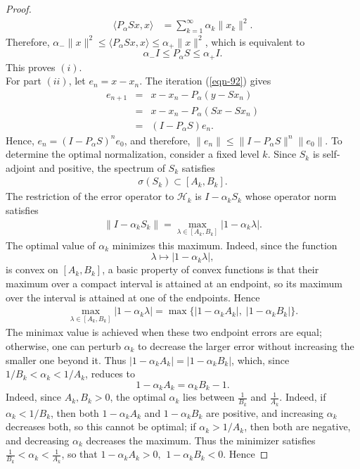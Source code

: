 \documentclass[12pt,titlepage]{amsart}
\theoremstyle{definition}
\theoremstyle{remark}
\begin{document}
\begin{proof}
\begin{eqnarray*}
\langle P_\alpha Sx,x\rangle &= \sum_{k=1}^{\infty}
\alpha_k\|x_k\|^2.
\end{eqnarray*}
Therefore, $\alpha_-\|x\|^2 \le \langle P_\alpha Sx,x\rangle \le
\alpha_+\|x\|^2$, which is equivalent to $$\alpha_-I \le P_\alpha
S \le \alpha_+I.$$ This proves $(i)$.\\
For part $(ii)$, let $e_n=x-x_n $. The iteration (\ref{eqn-92})
gives
\begin{eqnarray*}
e_{n+1} &=& x-x_n-P_\alpha(y-Sx_n)\\ &=& x-x_n-P_\alpha(Sx-Sx_n)\\
&=& (I-P_\alpha S)e_n .
\end{eqnarray*}
Hence, $e_n=(I-P_\alpha S)^ne_0$, and therefore, $\|e_n\| \leq
\|I-P_\alpha S\|^n \|e_0\|$. To determine the optimal
normalization, consider a fixed level $k$. Since $S_k$ is
self-adjoint and positive, the spectrum of $S_k$ satisfies
\begin{eqnarray*}
\sigma(S_k) \subset[A_k,B_k].
\end{eqnarray*}
The restriction of the error operator to $\mathcal H_k$ is
$I-\alpha_kS_k$ whose operator norm satisfies
\begin{eqnarray*}
\|I-\alpha_kS_k\| = \max_{\lambda\in[A_k,B_k]}
|1-\alpha_k\lambda|.
\end{eqnarray*}
The optimal value of $\alpha_k$ minimizes this maximum. Indeed,
since the function $$\lambda \longmapsto |1-\alpha_k\lambda|,$$ is
convex on $[A_k,B_k]$, a basic property of convex functions is
that their maximum over a compact interval is attained at an
endpoint, so its maximum over the interval is attained at one of
the endpoints. Hence
\begin{eqnarray*}
\max_{\lambda\in[A_k,B_k]}|1-\alpha_k\lambda| =
\max\{|1-\alpha_kA_k|,\;|1-\alpha_kB_k|\}.
\end{eqnarray*}
The minimax value is achieved when these two endpoint errors are
equal; otherwise, one can perturb $\alpha_k$ to decrease the
larger error without increasing the smaller one beyond it. Thus
$|1-\alpha_kA_k| = |1-\alpha_kB_k|$, which, since
$1/B_k<\alpha_k<1/A_k$, reduces to $$1-\alpha_kA_k =
\alpha_kB_k-1.$$ Indeed, since $A_k,B_k>0$, the optimal $\alpha_k$
lies between $\frac{1}{B_k}$ and $\frac{1}{A_k}$. Indeed, if
$\alpha_k<1/B_k$, then both $1-\alpha_k A_k$ and $1-\alpha_k B_k$
are positive, and increasing $\alpha_k$ decreases both, so this
cannot be optimal; if $\alpha_k>1/A_k$, then both are negative,
and decreasing $\alpha_k$ decreases the maximum. Thus the
minimizer satisfies $\frac1{B_k} < \alpha_k < \frac1{A_k}$, so
that $1-\alpha_k A_k>0, \,\ 1-\alpha_k B_k<0$. Hence


\end{proof}
\end{document}
